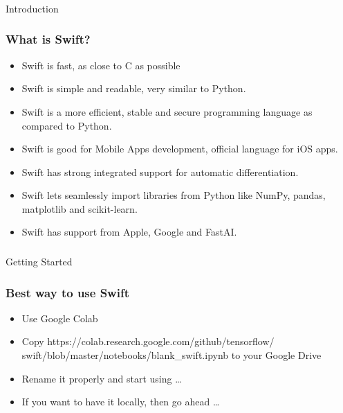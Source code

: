 \begin{frame}[fragile]\frametitle{}
\begin{center}
{\Large Introduction}
\end{center}
\end{frame}



\begin{frame} \frametitle{What is Swift?}
\begin{itemize}
\item Swift is fast, as close to C as possible
\item Swift is simple and readable, very similar to Python. 
\item Swift is a more efficient, stable and secure programming language as compared to Python.
\item Swift is good for Mobile Apps development, official language for iOS apps.
\item Swift has strong integrated support for automatic differentiation.
\item Swift lets seamlessly import libraries from Python like NumPy, pandas, matplotlib and scikit-learn. 
\item Swift has support from Apple, Google and FastAI.
\end{itemize}
\end{frame}



\begin{frame}[fragile]\frametitle{}
\begin{center}
{\Large Getting Started}
\end{center}
\end{frame}

\begin{frame} \frametitle{Best way to use Swift}

\begin{itemize}
\item Use Google Colab
\item Copy https://colab.research.google.com/github/tensorflow/ swift/blob/master/notebooks/blank\_swift.ipynb to your Google Drive
\item Rename it properly and start using \ldots
\item If you want to have it locally, then go ahead \ldots
\end{itemize}

\end{frame}


